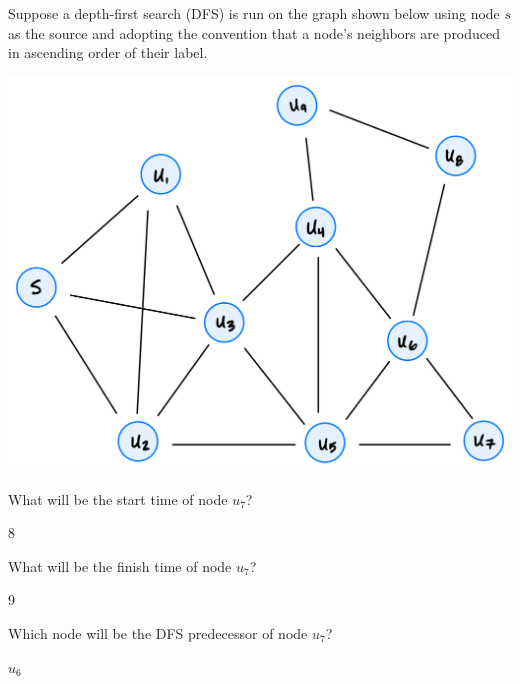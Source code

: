 \begin{prob}
    Suppose a depth-first search (DFS) is run on the graph shown below using
    node $s$ as the source and adopting the convention that a node's neighbors
    are produced in ascending order of their label.

    \includegraphics{./graph.png}

    \begin{subprobset}

        \begin{subprob}
            What will be the start time of node $u_7$?

            \begin{soln}
                8
            \end{soln}
        \end{subprob}

        \begin{subprob}
            What will be the finish time of node $u_7$?

            \begin{soln}
                9
            \end{soln}
        \end{subprob}

        \begin{subprob}
            Which node will be the DFS predecessor of node $u_7$?

            \begin{soln}
                $u_6$
            \end{soln}
        \end{subprob}

    \end{subprobset}


\end{prob}
